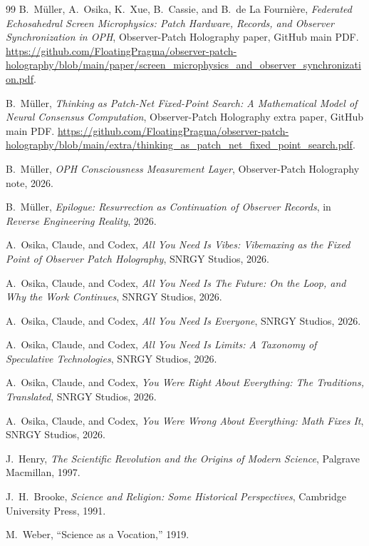 \documentclass[11pt]{article}
\theoremstyle{remark}
\theoremstyle{plain}
\begin{document}
\begin{thebibliography}{99}
B.\ M\"uller, A.\ Osika, K.\ Xue, B.\ Cassie, and B.\ de La Fourni\`ere,
\emph{Federated Echosahedral Screen Microphysics: Patch Hardware, Records, and Observer Synchronization in OPH},
Observer-Patch Holography paper, GitHub main PDF.
\url{https://github.com/FloatingPragma/observer-patch-holography/blob/main/paper/screen_microphysics_and_observer_synchronization.pdf}.

B.\ M\"uller,
\emph{Thinking as Patch-Net Fixed-Point Search: A Mathematical Model of Neural Consensus Computation},
Observer-Patch Holography extra paper, GitHub main PDF.
\url{https://github.com/FloatingPragma/observer-patch-holography/blob/main/extra/thinking_as_patch_net_fixed_point_search.pdf}.

B.\ M\"uller,
\emph{OPH Consciousness Measurement Layer},
Observer-Patch Holography note, 2026.

B.\ M\"uller,
\emph{Epilogue: Resurrection as Continuation of Observer Records},
in \emph{Reverse Engineering Reality}, 2026.

A.\ Osika, Claude, and Codex,
\emph{All You Need Is Vibes: Vibemaxing as the Fixed Point of Observer Patch Holography},
SNRGY Studios, 2026.

A.\ Osika, Claude, and Codex,
\emph{All You Need Is The Future: On the Loop, and Why the Work Continues},
SNRGY Studios, 2026.

A.\ Osika, Claude, and Codex,
\emph{All You Need Is Everyone},
SNRGY Studios, 2026.

A.\ Osika, Claude, and Codex,
\emph{All You Need Is Limits: A Taxonomy of Speculative Technologies},
SNRGY Studios, 2026.

A.\ Osika, Claude, and Codex,
\emph{You Were Right About Everything: The Traditions, Translated},
SNRGY Studios, 2026.

A.\ Osika, Claude, and Codex,
\emph{You Were Wrong About Everything: Math Fixes It},
SNRGY Studios, 2026.

J.\ Henry,
\emph{The Scientific Revolution and the Origins of Modern Science},
Palgrave Macmillan, 1997.

J.\ H.\ Brooke,
\emph{Science and Religion: Some Historical Perspectives},
Cambridge University Press, 1991.

M.\ Weber,
``Science as a Vocation,''
1919.


\end{thebibliography}
\end{document}
